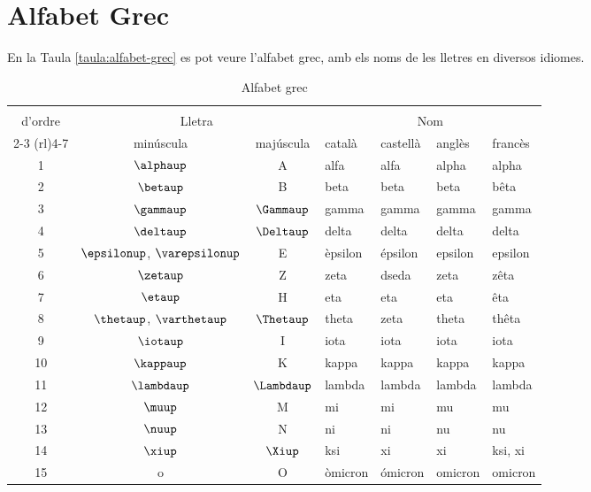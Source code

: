 \chapter{Alfabet Grec} 

 En la Taula \vref{taula:alfabet-grec} es pot veure l'alfabet grec,
 amb els noms de les lletres en diversos idiomes.

\begin{table}[h]
   \caption{\label{taula:alfabet-grec} Alfabet grec}
   \begin{center}\begin{tabular}{cccllll}
   \toprule[1pt]
   \renewcommand*{\multirowsetup}{\centering}
   \multirow{2}{15mm}{\rule{0mm}{4.5mm}N\'{u}mero\\d'ordre} & \multicolumn{2}{c}{Lletra} &
   \multicolumn{4}{c}{Nom} \\
   \cmidrule(rl){2-3} \cmidrule(rl){4-7}
    & min\'{u}scula & maj\'{u}scula & catal\`{a} & castell\`{a} &  angl\`{e}s & franc\`{e}s\\
   \midrule
   1  & $\alphaup$ & A & alfa & alfa &  alpha & alpha\\
   2  & $\betaup$ & B & beta & beta &  beta & b\^{e}ta\\
   3  & $\gammaup$ & $\Gammaup$ & gamma & gamma &  gamma & gamma\\
   4  & $\deltaup$ & $\Deltaup$ & delta & delta &  delta & delta\\
   5  & $\epsilonup$, $\varepsilonup$ & E & \`{e}psilon & \'{e}psilon &  epsilon & epsilon\\
   6  & $\zetaup$ & Z & zeta & dseda &  zeta & z\^{e}ta\\
   7  & $\etaup$ & H & eta & eta &  eta & \^{e}ta\\
   8  & $\thetaup$, $\varthetaup$ & $\Thetaup$ & theta & zeta &  theta & th\^{e}ta\\
   9  & $\iotaup$ & I & iota & iota &  iota & iota\\
   10 & $\kappaup$ & K & kappa & kappa &  kappa & kappa\\
   11 & $\lambdaup$ & $\Lambdaup$ & lambda & lambda &  lambda &lambda\\
   12 & $\muup$ & M & mi & mi &  mu & mu\\
   13 & $\nuup$ & N & ni & ni &  nu & nu\\
   14 & $\xiup$ & $\Xiup$ & ksi & xi &  xi & ksi, xi\\
   15 & o & O & \`{o}micron & \'{o}micron &  omicron & omicron\\

\end{tabular}
\end{center}
\end{table}
